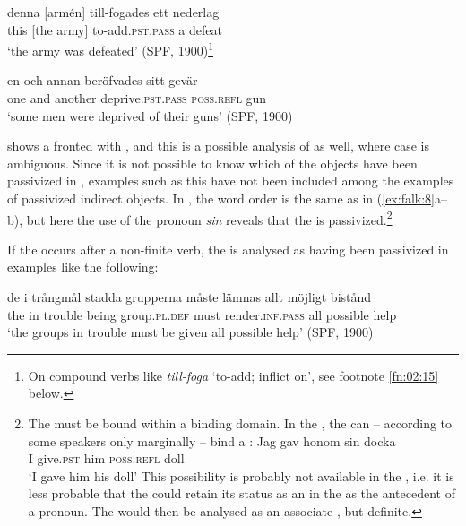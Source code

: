 \documentclass[output=paper]{langscibook}
\begin{document}
\ex \label{ex:falk:8b}
\gll denna [armén]    till-fogades      ett  nederlag\\
      this {[the army]}    to-add.\textsc{pst}.\textsc{pass}  a   defeat\\
\glt       ‘the army was defeated’ (SPF, 1900)\footnote{On compound verbs like \textit{till-foga} ‘to-add; inflict on’, see footnote \ref{fn:02:15} below.}

\ex \label{ex:falk:8c}
\gll en    och  annan  beröfvades      sitt      gevär\\
      one  and  another  deprive\textsc{.pst}.\textsc{pass}  \textsc{poss.refl}  gun\\
\glt ‘some men were deprived of their guns’ (SPF, 1900)
\z
\z

 shows a fronted  with , and this is a possible analysis of  as well, where case is ambiguous. Since it is not possible to know which of the objects have been passivized in , examples such as this have not been included among the examples of passivized indirect objects. In , the word order is the same as in (\ref{ex:falk:8}a–b), but here the use of the  pronoun \textit{sin} reveals that the  is passivized.\footnote{The   must be bound within a binding domain. In the , the  can – according to some speakers only marginally – bind a  : 
\ea \gll Jag  gav    honom    sin    docka\\
     I      give.\textsc{pst}  him      \textsc{poss}.\textsc{refl}  doll\\
    \glt ‘I gave him his doll’
\z This possibility is probably not available in the , i.e. it is less probable that the  could retain its status as an  in the  as the antecedent of a  pronoun. The  would then be analysed as an associate , but definite.}


If the  occurs after a non-finite verb, the  is analysed as having been passivized in examples like the following:\largerpage

\ea%
    \label{ex:falk:9}
\gll de  i     trångmål  stadda  grupperna    måste  lämnas          allt  möjligt    bistånd\\
    the  in  trouble    being    group\textsc{.pl.def}   must  render\textsc{.inf}.\textsc{pass}  all    possible  help\\
\glt ‘the groups in trouble must be given all possible help’ (SPF, 1900)
\z
\end{document}
